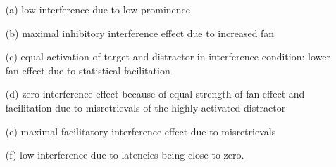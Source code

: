 \documentclass{cambridge7A}\usepackage[]{graphicx}\usepackage[]{color}
\begin{document}
\begin{enumerate}
 		\item[(a)] low interference due to low prominence
 		\item[(b)] maximal inhibitory interference effect due to increased fan
 		\item[(c)] equal activation of target and distractor in interference condition: lower fan effect due to statistical facilitation
 		\item[(d)] zero interference effect because of equal strength of fan effect and facilitation due to misretrievals of the highly-activated distractor
 		\item[(e)] maximal facilitatory interference effect due to misretrievals
 		\item[(f)] low interference due to latencies being close to zero.
\end{enumerate}
\end{document}
